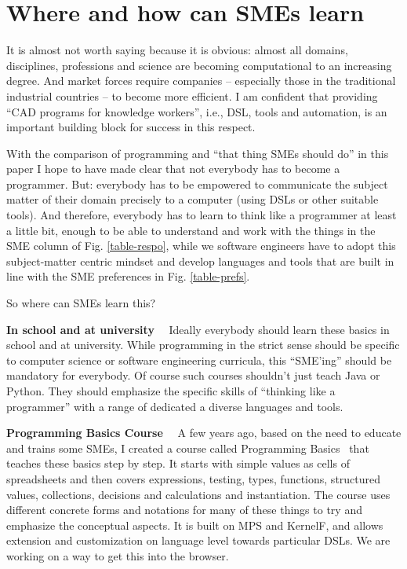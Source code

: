 \documentclass[runningheads]{llncs}
\newcommand\parhead[1]{\vspace{1mm}\noindent\textbf{{#1}}\ \ }
\newcommand{\fig}[1]{Fig. \ref{#1}}  %
\begin{document}
\section{Where and how can SMEs learn}

It is almost not worth saying because it is obvious: almost all domains,
disciplines, professions and science are becoming computational to an 
increasing degree. And market forces require companies -- especially those
in the traditional industrial countries -- to become more efficient. I
am confident that providing ``CAD programs for knowledge workers'', i.e.,
DSL, tools and automation, is an important building block for success in
this respect. 

With the comparison of programming and ``that thing SMEs should do'' in this
paper I hope to have made clear that not everybody has to become a programmer.
But: everybody has to be empowered to communicate the subject matter of their
domain precisely to a computer (using DSLs or other suitable tools). And
therefore, everybody has to learn to think like a programmer at least a little
bit, enough to be able to understand and work with the things in the SME column
of \fig{table-respo}, while we software engineers have to adopt this
subject-matter centric mindset and develop languages and tools that are built in
line with the SME preferences in \fig{table-prefs}. 

\vspace{3mm}
\noindent So where can SMEs learn this? 
\vspace{3mm}

\parhead{In school and at university} Ideally
everybody should learn these basics in school and at university. While
programming in the strict sense should be specific to computer science or
software engineering curricula, this ``SME'ing'' should be mandatory for
everybody. Of course such courses shouldn't just teach Java or Python. They
should emphasize the specific skills of ``thinking like a programmer'' with a
range of dedicated a diverse languages and tools.

\parhead{Programming Basics Course} A few years ago, based on the need to educate and
trains some SMEs, I created a course called Programming Basics~\cite{voelterProgBas} that teaches
these basics step by step. It starts with simple values as cells of spreadsheets
and then covers expressions, testing, types, functions, structured values,
collections, decisions and calculations and instantiation. The course uses
different concrete forms and notations for many of these things to try and
emphasize the conceptual aspects. It is built on MPS and KernelF, and allows
extension and customization on language level towards particular DSLs. We are
working on a way to get this into the browser.
\end{document}

